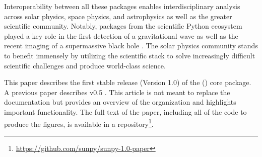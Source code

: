 Interoperability between all these packages enables interdisciplinary analysis across solar physics, space physics, and astrophysics as well as the greater scientific community.
Notably, packages from the scientific Python ecosystem played a key role in the first detection of a gravitational wave \citep{ligo_scientific_collaboration_and_virgo_collaboration_observation_2016} as well as the recent imaging of a supermassive black hole \citep{collaboration_first_2019}.
The solar physics community stands to benefit immensely by utilizing the \python scientific stack to solve increasingly difficult scientific challenges and produce world-class science.

This paper describes the first stable release (Version 1.0) of the (\sunpypkg) core package.
A previous paper describes v0.5 \citep{Community:2015cy}.
This article is not meant to replace the \sunpypkg documentation but provides an overview of the organization and highlights important functionality.
The full text of the paper, including all of the code to produce the figures, is available in a \github repository\footnote{\url{https://github.com/sunpy/sunpy-1.0-paper}}.
